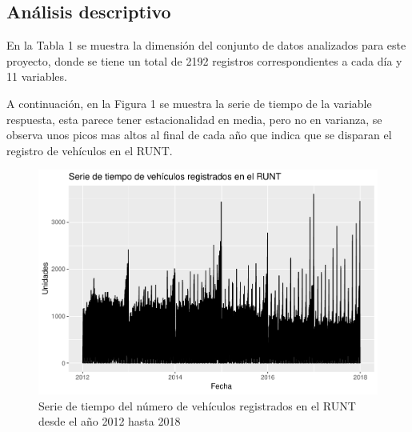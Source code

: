 \documentclass[11pt,twoside]{article}
\begin{document}
\subsection{Análisis descriptivo}

En la Tabla 1 se muestra la dimensión del conjunto de datos analizados para este proyecto, donde se tiene un total de 2192 registros correspondientes a cada día  y 11 variables.

\begin{table}[H]
	\caption{\small{Dimensión de la base de datos.}}
	\label{tabla1}
\end{table}
\noindent A continuación, en la Figura 1 se muestra la serie de tiempo de la variable respuesta, esta parece tener estacionalidad en media, pero no en varianza, se observa unos picos mas altos al final de cada año que indica que se disparan el registro de vehículos en el RUNT. 


\begin{figure}[H]
	\centering
	\includegraphics{serie1.pdf}
	\caption{Serie de tiempo del número de vehículos registrados en el RUNT desde el año 2012 hasta 2018}
\end{figure}
\end{document}

